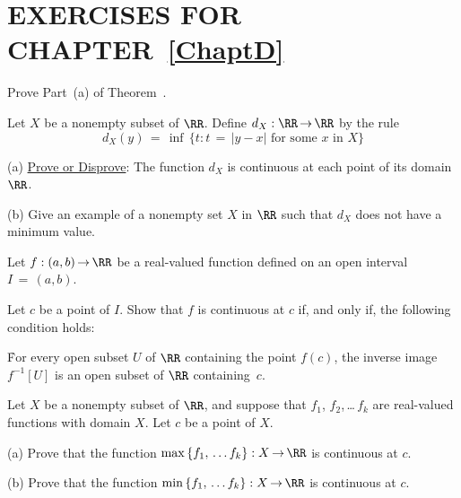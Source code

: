                        \section{EXERCISES FOR CHAPTER~\ref{ChaptD}}
                        \label{SectDEX}

\V
\V
\V
\V

\noindent  \ExDa Prove Part~(a) of Theorem~.

\V
\V

\noindent \ExDb Let $X$ be a nonempty subset of ${\RR}$. Define $d_{X}:{\RR} \,{\rightarrow}\, {\RR}$ by the rule
        \begin{displaymath}
        d_{X}(y) \,=\, {\inf}\,\{t: t \,=\, |y-x| \mbox{ for some $x$ in $X$}\}
        \end{displaymath}

\V

        (a) \underline{Prove or Disprove}: The function $d_{X}$ is continuous at each point of its domain ${\RR}$.

\V

        (b) Give an example of a nonempty set $X$ in ${\RR}$ such that $d_{X}$ does not have a minimum value.


\V
\V

\noindent \ExDc Let $f:(a,b) \,{\rightarrow}\, {\RR}$ be a real-valued function defined on an open interval $I \,=\, (a,b)$.

\V

        Let $c$ be a point of $I$. Show that $f$ is continuous at $c$ if, and only if, the following condition holds:

        \h For every open subset $U$ of ${\RR}$ containing the point $f(c)$, the inverse image $f^{-1}[U]$ is an open subset of ${\RR}$ containing~$c$.

\V
\V

\noindent \ExDd Let $X$ be a nonempty subset of ${\RR}$, and suppose that $f_{1}$, $f_{2}$,\,{\ldots}\,$f_{k}$ are real-valued functions with domain $X$.
    Let $c$ be a point of $X$.

\V

    (a) Prove that the function ${\max}\,\{f_{1},\,{\ldots}\,f_{k}\}:X \,{\rightarrow}\, {\RR}$ is continuous at $c$.

\V

    (b) Prove that the function ${\min}\,\{f_{1},\,{\ldots}\,f_{k}\}:X \,{\rightarrow}\, {\RR}$ is continuous at $c$.


\V
\V

